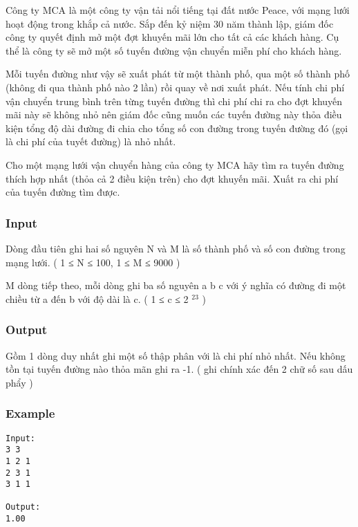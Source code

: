 



   Công ty MCA là một công ty vận tải nổi tiếng tại đất nước Peace, với mạng lưới hoạt động trong khắp cả nước. Sắp đến kỷ niệm 30 năm thành lập, giám đốc công ty quyết định mở một đợt khuyến mãi lớn cho tất cả các khách hàng. Cụ thể là công ty sẽ mở một số tuyến đường vận chuyển miễn phí cho khách hàng.  

   Mỗi tuyến đường như vậy sẽ xuất phát từ một thành phố, qua một số thành phố (không đi qua thành phố nào 2 lần) rồi quay về nơi xuất phát. Nếu tính chi phí vận chuyển trung bình trên từng tuyến đường thì chi phí chi ra cho đợt khuyến mãi này sẽ không nhỏ nên giám đốc cũng muốn các tuyến đường này thỏa điều kiện tổng độ dài đường đi chia cho tổng số con đường trong tuyến đường đó (gọi là chi phí của tuyết đường) là nhỏ nhất.  

   Cho một mạng lưới vận chuyển hàng của công ty MCA hãy tìm ra tuyến đường thích hợp nhất (thỏa cả 2 điều kiện trên) cho đợt khuyến mãi. Xuất ra chi phí của tuyến đường tìm được.  

\subsubsection{   Input  }

   Dòng đầu tiên ghi hai số nguyên N và M là số thành phố và số con đường trong mạng lưới. ( 1 ≤ N ≤ 100,  1 ≤ M ≤ 9000 )  

   M dòng tiếp theo, mỗi dòng ghi ba số nguyên a b c với ý nghĩa có đường đi một chiều từ a đến b với độ dài là c. ( 1 ≤ c ≤ 2   $^    23   $   )  

\subsubsection{   Output  }

   Gồm 1 dòng duy nhất ghi một số thập phân với là chi phí nhỏ nhất. Nếu không tồn tại tuyến đường nào thỏa mãn ghi ra -1. ( ghi chính xác đến 2 chữ số sau dấu phẩy )  

\subsubsection{   Example  }
\begin{verbatim}
Input:
3 3
1 2 1
2 3 1
3 1 1

Output:
1.00

\end{verbatim}